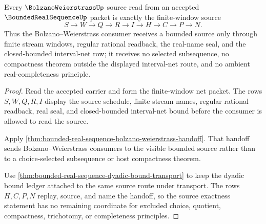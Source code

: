 \begin{theorem}
\label{thm:bounded-real-sequence-bolzano-source-exactness}
Every $\BolzanoWeierstrassUp$ source read from an accepted $\BoundedRealSequenceUp$ packet is exactly the finite-window source
$$
S \to W \to Q \to R \to I \to H \to C \to P \to N.
$$
Thus the Bolzano--Weierstrass consumer receives a bounded source only through finite stream windows, regular rational readback, the real-name seal, and the closed-bounded interval-net row; it receives no selected subsequence, no compactness theorem outside the displayed interval-net route, and no ambient real-completeness principle.
\end{theorem}
\begin{proof}
Read the accepted carrier and form the finite-window net packet. The rows $S,W,Q,R,I$ display the source schedule, finite stream names, regular rational readback, real seal, and closed-bounded interval-net bound before the consumer is allowed to read the source.

Apply \autoref{thm:bounded-real-sequence-bolzano-weierstrass-handoff}. That handoff sends Bolzano--Weierstrass consumers to the visible bounded source rather than to a choice-selected subsequence or host compactness theorem.

Use \autoref{thm:bounded-real-sequence-dyadic-bound-transport} to keep the dyadic bound ledger attached to the same source route under transport. The rows $H,C,P,N$ replay, source, and name the handoff, so the source exactness statement has no remaining coordinate for excluded choice, quotient, compactness, trichotomy, or completeness principles.
\end{proof}

